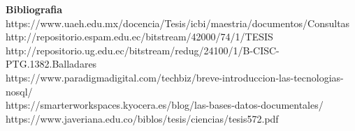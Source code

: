\documentclass[%
 reprint,
 amsmath,amssymb,
 aps,
]{revtex4-1}
\begin{document}

\textbf{Bibliografia}\\
https://www.uaeh.edu.mx/docencia/Tesis/icbi/maestria/documentos/Consultas\\       
http://repositorio.espam.edu.ec/bitstream/42000/74/1/TESIS\\
http://repositorio.ug.edu.ec/bitstream/redug/24100/1/B-CISC-PTG.1382.Balladares \\
https://www.paradigmadigital.com/techbiz/breve-introduccion-las-tecnologias-nosql/ \\
https://smarterworkspaces.kyocera.es/blog/las-bases-datos-documentales/ \\
https://www.javeriana.edu.co/biblos/tesis/ciencias/tesis572.pdf \\
\end{document}
